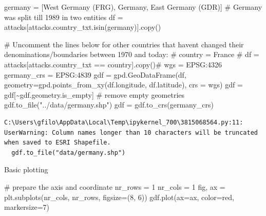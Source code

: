\documentclass[
  letterpaper,
  DIV=11,
  numbers=noendperiod]{scrreprt}
\newenvironment{Shaded}{\begin{snugshade}}{\end{snugshade}}
\newcommand{\CommentTok}[1]{\textcolor[rgb]{0.37,0.37,0.37}{#1}}
\newcommand{\DecValTok}[1]{\textcolor[rgb]{0.68,0.00,0.00}{#1}}
\newcommand{\NormalTok}[1]{\textcolor[rgb]{0.00,0.23,0.31}{#1}}
\newcommand{\OperatorTok}[1]{\textcolor[rgb]{0.37,0.37,0.37}{#1}}
\newcommand{\StringTok}[1]{\textcolor[rgb]{0.13,0.47,0.30}{#1}}
\begin{document}
\begin{Shaded}
\begin{Highlighting}[]
\NormalTok{germany }\OperatorTok{=}\NormalTok{ [}\StringTok{\textquotesingle{}West Germany (FRG)\textquotesingle{}}\NormalTok{, }\StringTok{\textquotesingle{}Germany\textquotesingle{}}\NormalTok{, }\StringTok{\textquotesingle{}East Germany (GDR)\textquotesingle{}}\NormalTok{] }\CommentTok{\# Germany was split till 1989 in two entities}
\NormalTok{df }\OperatorTok{=}\NormalTok{ attacks[attacks.country\_txt.isin(germany)].copy()}

\CommentTok{\# Uncomment the lines below for other countries that haven\textquotesingle{}t changed their denominations/boundaries between 1970 and today:}
\CommentTok{\# country = \textquotesingle{}France\textquotesingle{} }
\CommentTok{\# df = attacks[attacks.country\_txt == country].copy()\#}
\NormalTok{wgs }\OperatorTok{=} \StringTok{\textquotesingle{}EPSG:4326\textquotesingle{}}
\NormalTok{germany\_crs }\OperatorTok{=} \StringTok{\textquotesingle{}EPSG:4839\textquotesingle{}}
\NormalTok{gdf }\OperatorTok{=}\NormalTok{ gpd.GeoDataFrame(df, geometry}\OperatorTok{=}\NormalTok{gpd.points\_from\_xy(df.longitude, df.latitude), crs }\OperatorTok{=}\NormalTok{ wgs)}
\NormalTok{gdf }\OperatorTok{=}\NormalTok{ gdf[}\OperatorTok{\textasciitilde{}}\NormalTok{gdf.geometry.is\_empty] }\CommentTok{\# remove empty geometries}
\NormalTok{gdf.to\_file(}\StringTok{"../data/germany.shp"}\NormalTok{)}
\NormalTok{gdf }\OperatorTok{=}\NormalTok{ gdf.to\_crs(germany\_crs)}
\end{Highlighting}
\end{Shaded}

\begin{verbatim}
C:\Users\gfilo\AppData\Local\Temp\ipykernel_700\3815068564.py:11: UserWarning: Column names longer than 10 characters will be truncated when saved to ESRI Shapefile.
  gdf.to_file("data/germany.shp")
\end{verbatim}

Basic plotting

\begin{Shaded}
\begin{Highlighting}[]
\CommentTok{\# prepare the axis and coordinate}
\NormalTok{nr\_rows }\OperatorTok{=} \DecValTok{1}
\NormalTok{nr\_cols }\OperatorTok{=} \DecValTok{1}
\NormalTok{fig, ax }\OperatorTok{=}\NormalTok{ plt.subplots(nr\_cols, nr\_rows, figsize}\OperatorTok{=}\NormalTok{(}\DecValTok{8}\NormalTok{, }\DecValTok{6}\NormalTok{))}
\NormalTok{gdf.plot(ax}\OperatorTok{=}\NormalTok{ax, color}\OperatorTok{=}\StringTok{\textquotesingle{}red\textquotesingle{}}\NormalTok{, markersize}\OperatorTok{=}\DecValTok{7}\NormalTok{)}
\end{Highlighting}
\end{Shaded}
\end{document}

